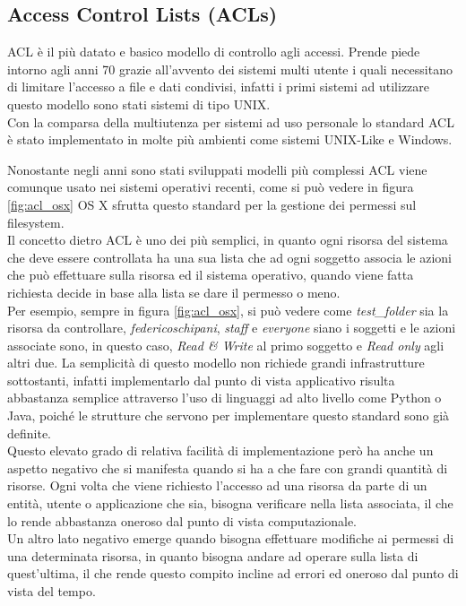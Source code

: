 \subsection*{Access Control Lists (ACLs)}
\label{sub:ACL}

ACL è il più datato e basico modello di controllo agli accessi. Prende piede intorno agli anni 70
grazie all'avvento dei sistemi multi utente i quali necessitano di limitare l'accesso a file e dati condivisi, infatti i primi sistemi ad utilizzare questo modello sono stati sistemi di tipo UNIX.\\
Con la comparsa della multiutenza per sistemi ad uso personale lo standard ACL è stato implementato in molte più ambienti come sistemi UNIX-Like e Windows.

Nonostante negli anni sono stati sviluppati modelli più complessi ACL viene comunque usato nei sistemi operativi recenti, come si può vedere in figura \ref{fig:acl_osx} OS X sfrutta questo standard per la gestione dei permessi sul filesystem.\\
Il concetto dietro ACL è uno dei più semplici, in quanto ogni risorsa del sistema che deve essere controllata ha una sua lista che ad ogni soggetto associa le azioni che può effettuare sulla risorsa ed il sistema operativo, quando viene fatta richiesta decide in base alla lista se dare il permesso o meno.\\
Per esempio, sempre in figura \ref{fig:acl_osx}, si può vedere come \textit{test\_folder} sia la risorsa da controllare, \textit{federicoschipani}, \textit{staff} e \textit{everyone} siano i soggetti e le azioni associate sono, in questo caso, \textit{Read \& Write} al primo soggetto e \textit{Read only} agli altri due.
La semplicità di questo modello non richiede grandi infrastrutture sottostanti, infatti implementarlo dal punto di vista applicativo risulta abbastanza semplice attraverso l'uso di linguaggi ad alto livello come Python o Java, poiché le strutture che servono per implementare questo standard sono già definite.\\
Questo elevato grado di relativa facilità di implementazione però ha anche un aspetto negativo che si manifesta quando si ha a che fare con grandi quantità di risorse. Ogni volta che viene richiesto l'accesso ad una risorsa da parte di un entità, utente o applicazione che sia, bisogna verificare nella lista associata, il che lo rende abbastanza oneroso dal punto di vista computazionale.\\
Un altro lato negativo emerge quando bisogna effettuare modifiche ai permessi di una determinata risorsa, in quanto bisogna andare ad operare sulla lista di quest'ultima, il che rende questo compito incline ad errori ed oneroso dal punto di vista del tempo.


